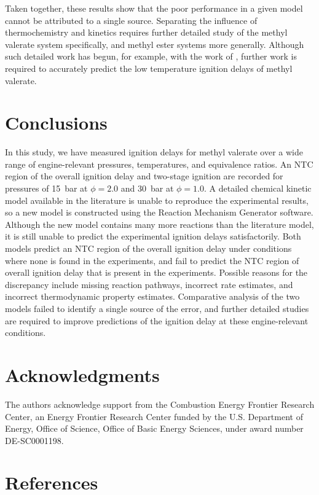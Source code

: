 \documentclass[letterpaper, review, sort&compress]{elsarticle}
\begin{document}
Taken together, these results show that the poor performance in a given model cannot be attributed
to a single source. Separating the influence of thermochemistry and kinetics requires further
detailed study of the methyl valerate system specifically, and methyl ester systems more generally.
Although such detailed work has begun, for example, with the work of \citet{Hayes2009}, further work
is required to accurately predict the low temperature ignition delays of methyl valerate.

\section{Conclusions}\label{sec:conclusions}

In this study, we have measured ignition delays for methyl valerate over a wide range of
engine-relevant pressures, temperatures, and equivalence ratios. An NTC region of the overall
ignition delay and two-stage ignition are recorded for pressures of \SI{15}{\bar} at \(\phi=2.0\)
and \SI{30}{\bar} at \(\phi=1.0\). A detailed chemical kinetic model available in the literature is
unable to reproduce the experimental results, so a new model is constructed using the Reaction
Mechanism Generator software. Although the new model contains many more reactions than the
literature model, it is still unable to predict the experimental ignition delays satisfactorily.
Both models predict an NTC region of the overall ignition delay under conditions where none is found
in the experiments, and fail to predict the NTC region of overall ignition delay that is present in
the experiments. Possible reasons for the discrepancy include missing reaction pathways, incorrect
rate estimates, and incorrect thermodynamic property estimates. Comparative analysis of the two
models failed to identify a single source of the error, and further detailed studies are required to
improve predictions of the ignition delay at these engine-relevant conditions.

\section{Acknowledgments}\label{sec:acknowledgments}

The authors acknowledge support from the Combustion Energy Frontier Research Center, an Energy
Frontier Research Center funded by the U.S. Department of Energy, Office of Science, Office of Basic
Energy Sciences, under award number DE-SC0001198.

\section*{References}

\end{document}
